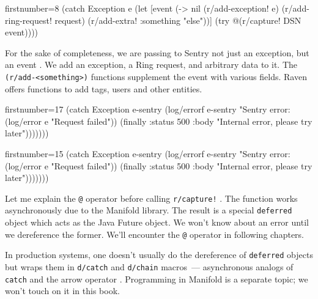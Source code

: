 \else

\begin{clojure/lines*}{firstnumber=8}
      (catch Exception e
        (let [event (-> nil
                        (r/add-exception! e)
                        (r/add-ring-request! request)
                        (r/add-extra! {:something "else"}))]
          (try
            @(r/capture! DSN event))))
\end{clojure/lines*}

\fi

For the sake of completeness, we are passing to Sentry not just an exception, but an event . We add an exception, a Ring request, and arbitrary data to it. The \verb|(r/add-<something>)| functions supplement the event with various fields. Raven offers functions to add tags, users and other entities.

\ifx\DEVICETYPE\MOBILE

\begin{clojure/lines*}{firstnumber=17}
(catch Exception e-sentry
  (log/errorf e-sentry
    "Sentry error: %
  (log/error e "Request failed"))
(finally
  {:status 500
   :body  "Internal error, please try
   later"})))))))
\end{clojure/lines*}

\else

\begin{clojure/lines*}{firstnumber=15}
            (catch Exception e-sentry
              (log/errorf e-sentry "Sentry error: %
              (log/error e "Request failed"))
            (finally
              {:status 500
               :body "Internal error, please try later"})))))))
\end{clojure/lines*}

\fi


Let me explain the \verb|@| operator before calling \verb|r/capture!| \ifx\DEVICETYPE\MOBILE{}\else{}\fi. The function works asynchronously due to the Manifold library. The result is a special \verb|deferred| object which acts as the Java Future object. We won't know about an error until we dereference the former. We'll encounter the \verb|@| operator in following chapters.

In production systems, one doesn't usually do the dereference of \verb|deferred| objects but wraps them in \verb|d/catch| and \verb|d/chain| macros~--- asynchronous analogs of \verb|catch| and the arrow operator \arr{}. Programming in Manifold is a separate topic; we won't touch on it in this book.

